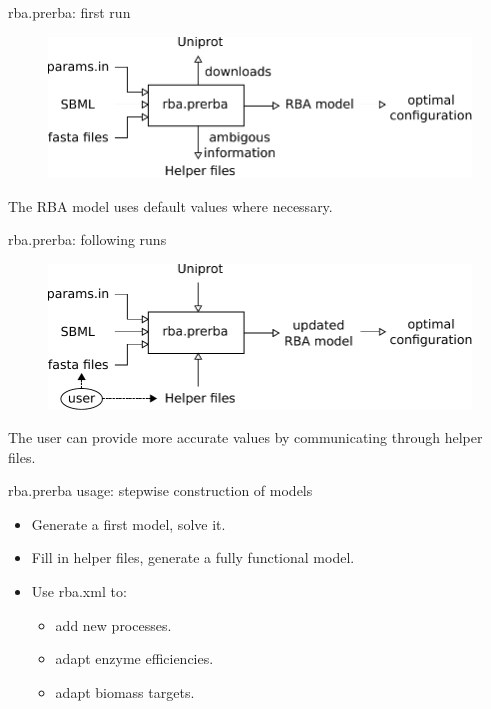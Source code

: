 \documentclass{beamer}
\begin{document}
\begin{frame}{rba.prerba: first run}
  \begin{figure}[!ht]
    \centering
    \includegraphics[width=\linewidth]{prerba_summary}
  \end{figure}
  The RBA model uses default values where necessary.
\end{frame}

\begin{frame}{rba.prerba: following runs}
  \begin{figure}[!ht]
    \centering
    \includegraphics[width=\linewidth]{prerba_summary_2}
  \end{figure}
  The user can provide more accurate values by communicating through
  helper files.
\end{frame}

\begin{frame}{rba.prerba usage: stepwise construction of models}
  \begin{itemize}
    \item Generate a first model, solve it.
    \item Fill in helper files, generate a fully functional model.
    \item Use rba.xml to:
    \begin{itemize}
      \item add new processes.
      \item adapt enzyme efficiencies.
      \item adapt biomass targets.
    \end{itemize}
  \end{itemize}
\end{frame}
\end{document}
